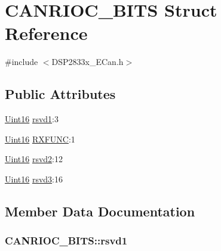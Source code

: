 \hypertarget{struct_c_a_n_r_i_o_c___b_i_t_s}{}\section{C\+A\+N\+R\+I\+O\+C\+\_\+\+B\+I\+T\+S Struct Reference}
\label{struct_c_a_n_r_i_o_c___b_i_t_s}


{\ttfamily \#include $<$D\+S\+P2833x\+\_\+\+E\+Can.\+h$>$}

\subsection*{Public Attributes}
\begin{DoxyCompactItemize}
\item 
\hyperlink{_d_s_p2833x___device_8h_a59a9f6be4562c327cbfb4f7e8e18f08b}{Uint16} \hyperlink{struct_c_a_n_r_i_o_c___b_i_t_s_a675e4dd951ab51d21f623fbf29e8e91b}{rsvd1}\+:3
\item 
\hyperlink{_d_s_p2833x___device_8h_a59a9f6be4562c327cbfb4f7e8e18f08b}{Uint16} \hyperlink{struct_c_a_n_r_i_o_c___b_i_t_s_acf85eaefdca5534644c2e522f1165380}{R\+X\+F\+U\+N\+C}\+:1
\item 
\hyperlink{_d_s_p2833x___device_8h_a59a9f6be4562c327cbfb4f7e8e18f08b}{Uint16} \hyperlink{struct_c_a_n_r_i_o_c___b_i_t_s_adc051bd0f47f7c09a2a1a966a7387872}{rsvd2}\+:12
\item 
\hyperlink{_d_s_p2833x___device_8h_a59a9f6be4562c327cbfb4f7e8e18f08b}{Uint16} \hyperlink{struct_c_a_n_r_i_o_c___b_i_t_s_a47ebdb84cefdc21bdee08f9d756d2928}{rsvd3}\+:16
\end{DoxyCompactItemize}


\subsection{Member Data Documentation}
\hypertarget{struct_c_a_n_r_i_o_c___b_i_t_s_a675e4dd951ab51d21f623fbf29e8e91b}{}
\subsubsection[{rsvd1}]{ C\+A\+N\+R\+I\+O\+C\+\_\+\+B\+I\+T\+S\+::rsvd1}\label{struct_c_a_n_r_i_o_c___b_i_t_s_a675e4dd951ab51d21f623fbf29e8e91b}
\hypertarget{struct_c_a_n_r_i_o_c___b_i_t_s_adc051bd0f47f7c09a2a1a966a7387872}{}
